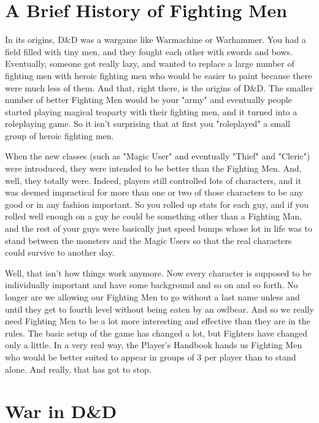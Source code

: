 \section{A Brief History of Fighting Men}

In its origins, D\&D was a wargame like Warmachine or Warhammer. You had a field filled with tiny men, and they fought each other with swords and bows. Eventually, someone got really lazy, and wanted to replace a large number of fighting men with heroic fighting men who would be easier to paint because there were much less of them. And that, right there, is the origins of D\&D. The smaller number of better Fighting Men would be your "army" and eventually people started playing magical teaparty with their fighting men, and it turned into a roleplaying game. So it isn't surprising that at first you "roleplayed" a small group of heroic fighting men.

When the new classes (such as "Magic User" and eventually "Thief" and "Cleric") were introduced, they were intended to be better than the Fighting Men. And, well, they totally were. Indeed, players still controlled lots of characters, and it was deemed impractical for more than one or two of those characters to be any good or in any fashion important. So you rolled up stats for each guy, and if you rolled well enough on a guy he could be something other than a Fighting Man, and the rest of your guys were basically just speed bumps whose lot in life was to stand between the monsters and the Magic Users so that the real characters could survive to another day.

Well, that isn't how things work anymore. Now every character is supposed to be individually important and have some background and so on and so forth. No longer are we allowing our Fighting Men to go without a last name unless and until they get to fourth level without being eaten by an owlbear. And so we really need Fighting Men to be a lot more interesting and effective than they are in the rules. The basic setup of the game has changed a lot, but Fighters have changed only a little. In a very real way, the Player's Handbook hands us Fighting Men who would be better suited to appear in groups of 3 per player than to stand alone. And really, that has got to stop.

\section{War in D\&D}
\vspace*{-10pt}

